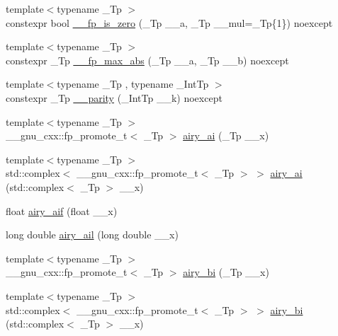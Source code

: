 \begin{DoxyCompactItemize}
\item 
{\footnotesize template$<$typename \+\_\+\+Tp $>$ }\\constexpr bool \hyperlink{namespace____gnu__cxx_aea3be1eb8940437aa8571ab8654af660}{\+\_\+\+\_\+fp\+\_\+is\+\_\+zero} (\+\_\+\+Tp \+\_\+\+\_\+a, \+\_\+\+Tp \+\_\+\+\_\+mul=\+\_\+\+Tp\{1\}) noexcept
\item 
{\footnotesize template$<$typename \+\_\+\+Tp $>$ }\\constexpr \+\_\+\+Tp \hyperlink{namespace____gnu__cxx_a85d72dd4ca7056d3a5979d03251ec38a}{\+\_\+\+\_\+fp\+\_\+max\+\_\+abs} (\+\_\+\+Tp \+\_\+\+\_\+a, \+\_\+\+Tp \+\_\+\+\_\+b) noexcept
\item 
{\footnotesize template$<$typename \+\_\+\+Tp , typename \+\_\+\+Int\+Tp $>$ }\\constexpr \+\_\+\+Tp \hyperlink{namespace____gnu__cxx_a35c2cbd743275d2ba01b42aeb5e65201}{\+\_\+\+\_\+parity} (\+\_\+\+Int\+Tp \+\_\+\+\_\+k) noexcept
\item 
{\footnotesize template$<$typename \+\_\+\+Tp $>$ }\\\+\_\+\+\_\+gnu\+\_\+cxx\+::fp\+\_\+promote\+\_\+t$<$ \+\_\+\+Tp $>$ \hyperlink{group__gnu__math__spec__func_gac84f8c4ad00ee677ad4d0b785925d983}{airy\+\_\+ai} (\+\_\+\+Tp \+\_\+\+\_\+x)
\item 
{\footnotesize template$<$typename \+\_\+\+Tp $>$ }\\std\+::complex$<$ \+\_\+\+\_\+gnu\+\_\+cxx\+::fp\+\_\+promote\+\_\+t$<$ \+\_\+\+Tp $>$ $>$ \hyperlink{group__gnu__math__spec__func_gacf37e6c9f186ade270b476c8e5826fb9}{airy\+\_\+ai} (std\+::complex$<$ \+\_\+\+Tp $>$ \+\_\+\+\_\+x)
\item 
float \hyperlink{group__gnu__math__spec__func_gaf317ba724c44b3a8271fe341d9870173}{airy\+\_\+aif} (float \+\_\+\+\_\+x)
\item 
long double \hyperlink{group__gnu__math__spec__func_ga800fdb61c672ae1831f4ca4250d657de}{airy\+\_\+ail} (long double \+\_\+\+\_\+x)
\item 
{\footnotesize template$<$typename \+\_\+\+Tp $>$ }\\\+\_\+\+\_\+gnu\+\_\+cxx\+::fp\+\_\+promote\+\_\+t$<$ \+\_\+\+Tp $>$ \hyperlink{group__gnu__math__spec__func_ga33c172cab7f8e9c99537444c7e30801a}{airy\+\_\+bi} (\+\_\+\+Tp \+\_\+\+\_\+x)
\item 
{\footnotesize template$<$typename \+\_\+\+Tp $>$ }\\std\+::complex$<$ \+\_\+\+\_\+gnu\+\_\+cxx\+::fp\+\_\+promote\+\_\+t$<$ \+\_\+\+Tp $>$ $>$ \hyperlink{group__gnu__math__spec__func_ga27cfc90cf84fae2acb2d55a9409ea49c}{airy\+\_\+bi} (std\+::complex$<$ \+\_\+\+Tp $>$ \+\_\+\+\_\+x)

\end{DoxyCompactItemize}
